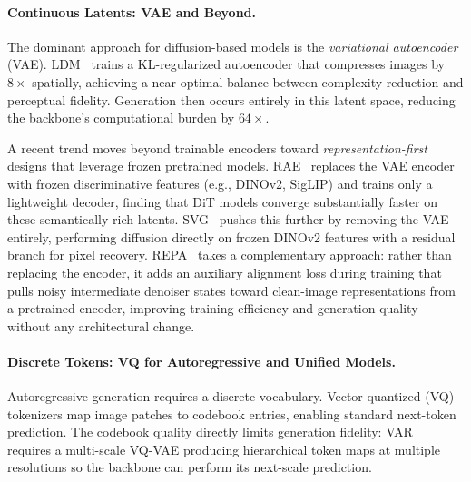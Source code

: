 \documentclass{llmxive}
\begin{document}
\paragraph{Continuous Latents: VAE and Beyond.}
The dominant approach for diffusion-based models is the \emph{variational autoencoder} (VAE). LDM~\citep{rombach2022stablediffusion} trains a KL-regularized autoencoder that compresses images by $8\times$ spatially, achieving a near-optimal balance between complexity reduction and perceptual fidelity. Generation then occurs entirely in this latent space, reducing the backbone's computational burden by $64\times$.

A recent trend moves beyond trainable encoders toward \emph{representation-first} designs that leverage frozen pretrained models. RAE~\citep{zheng2025rae} replaces the VAE encoder with frozen discriminative features (e.g., DINOv2, SigLIP) and trains only a lightweight decoder, finding that DiT models converge substantially faster on these semantically rich latents. SVG~\citep{shi2025svg} pushes this further by removing the VAE entirely, performing diffusion directly on frozen DINOv2 features with a residual branch for pixel recovery. REPA~\citep{yu2024representation} takes a complementary approach: rather than replacing the encoder, it adds an auxiliary alignment loss during training that pulls noisy intermediate denoiser states toward clean-image representations from a pretrained encoder, improving training efficiency and generation quality without any architectural change.

\paragraph{Discrete Tokens: VQ for Autoregressive and Unified Models.}
Autoregressive generation requires a discrete vocabulary. Vector-quantized (VQ) tokenizers map image patches to codebook entries, enabling standard next-token prediction. The codebook quality directly limits generation fidelity: VAR~\citep{tian2024visual} requires a multi-scale VQ-VAE producing hierarchical token maps at multiple resolutions so the backbone can perform its next-scale prediction.
\end{document}
